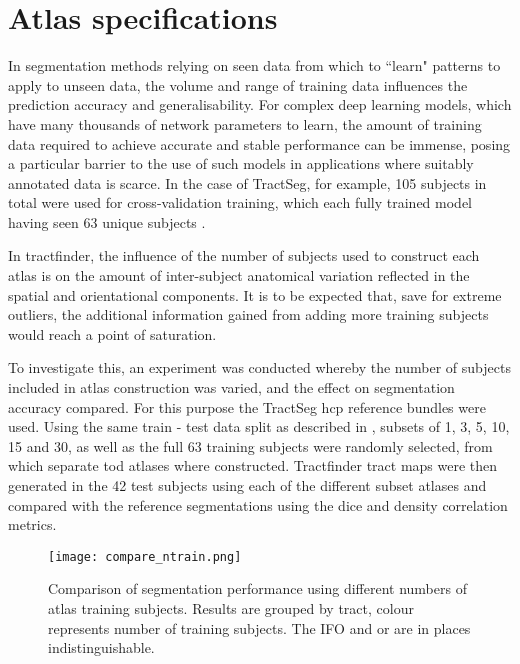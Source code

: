 \section{Atlas specifications}\label{sec:ntrain}


In segmentation methods relying on seen data from which to ``learn" patterns to apply to unseen data, the volume and range of training data influences the prediction accuracy and generalisability. 
For complex deep learning models, which have many thousands of network parameters to learn, the amount of training data required to achieve accurate and stable performance can be immense, posing a particular barrier to the use of such models in applications where suitably annotated data is scarce.
In the case of TractSeg, for example, 105 subjects in total were used for cross-validation training, which each fully trained model having seen 63 unique subjects .

In tractfinder, the influence of the number of subjects used to construct each atlas is on the amount of inter-subject anatomical variation reflected in the spatial and orientational components.
It is to be expected that, save for extreme outliers, the additional information gained from adding more training subjects would reach a point of saturation.

To investigate this, an experiment was conducted whereby the number of subjects included in atlas construction was varied, and the effect on segmentation accuracy compared.
For this purpose the TractSeg \gls{hcp} reference bundles were used.
Using the same train - test data split as described in , subsets of 1, 3, 5, 10, 15 and 30, as well as the full 63 training subjects were randomly selected, from which separate \gls{tod} atlases where constructed.
Tractfinder tract maps were then generated in the 42 test subjects using each of the different subset atlases and compared with the reference segmentations using the \gls{dice} and density correlation metrics.

\begin{figure}
    \texttt{[image: compare\_ntrain.png]}
    \caption{Comparison of segmentation performance using different numbers of atlas training subjects. Results are grouped by tract, colour represents number of training subjects. The IFO and \gls{or} are in places indistinguishable. }
    \label{fig:ntrain}
\end{figure}

